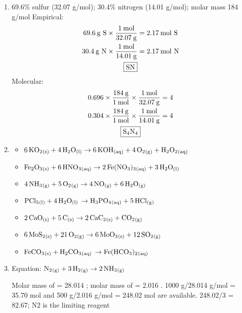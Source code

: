 \documentclass[a4paper, 12pt]{article}
\newcommand{\lab}[1]{\: \text{#1}}
\begin{document}
\begin{enumerate}[label=\alph*.]
\begin{gather*}
8.10/2.70 = 3.0 \\
2.70/2.70 = 1.0
\end{gather*}
As whole numbers:
\begin{gather*}
1.5 \times 2 = 3 \\
3.0 \times 2 = 6 \\
1.0 \times 2 = 2 \\
\boxed{\ce{C3H6O2}}
\end{gather*}
\item 69.6\% sulfur (32.07 g/mol); 30.4\% nitrogen (14.01 g/mol); molar mass 184 g/mol
Empirical:
\begin{gather*}
69.6 \lab{g S} \times \frac{1 \lab{mol}}{32.07 \lab{g}} = 2.17 \lab{mol S} \\
30.4 \lab{g N} \times \frac{1 \lab{mol}}{14.01 \lab{g}} = 2.17 \lab{mol N} \\
\boxed{\ce{SN}}
\end{gather*}
Molecular:
\begin{gather*}
0.696 \times \frac{184 \lab{g}}{1 \lab{mol}} \times \frac{1 \lab{mol}}{32.07 \lab{g}} = 4 \\
0.304 \times \frac{184 \lab{g}}{1 \lab{mol}} \times \frac{1 \lab{mol}}{14.01 \lab{g}} = 4 \\
\boxed{\ce{S4N4}}
\end{gather*}
\item 
\begin{itemize}
\item $\ce{6KO2_{(s)}} + \ce{4H2O_{(l)}} \to \ce{6KOH_{(aq)}} + \ce{4O2_{(g)}} + \ce{H2O2_{(aq)}}$
\item $\ce{Fe2O3_{(s)}} + \ce{6HNO3_{(aq)}} \to \ce{2Fe(NO3)3_{(aq)}} + \ce{3H2O_{(l)}}$
\item $\ce{4NH3_{(g)}} + \ce{5O2_{(g)}} \to \ce{4NO_{(g)}} + \ce{6H2O_{(g)}}$
\item $\ce{PCl5_{(l)} + 4H2O_{(l)} \to H3PO4_{(aq)} + 5HCl_{(g)}}$
\item $\ce{2CaO_{(s)} + 5C_{(s)}} \to \ce{2CaC2_{(s)} + CO2_{(g)}}$
\item $\ce{6MoS2_{(s)} + 21O2_{(g)}} \to \ce{6MoO3_{(s)} + 12SO2_{(g)}}$
\item $\ce{FeCO3_{(s)} + H2CO3_{(aq)} \to Fe(HCO3)2_{(aq)}}$
\end{itemize}
\item Equation: $\ce{N2_{(g)} + 3H2_{(g)}} \to \ce{2NH3_{(g)}}$

Molar mass of  = 28.014 \lab{g/mol}; molar mass of  = 2.016 \lab{g/mol}. 1000 g/28.014 g/mol = 35.70 mol  and 500 g/2.016 g/mol = 248.02 mol  are available. 248.02/3 = 82.67; N2 is the limiting reagent


\end{enumerate}
\end{document}
